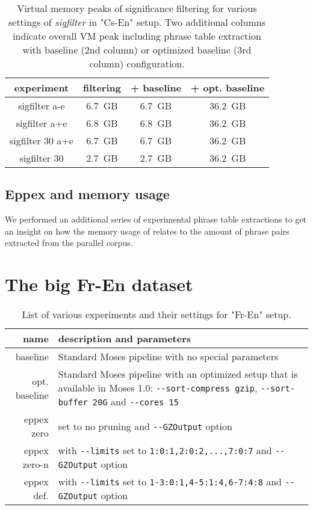 \begin{table}[ht]
\centering
\begin{tabular}{ | c | c | c | c | }
\hline
experiment & filtering & + baseline & + opt. baseline \\
\hline
\hline
sigfilter a-e     & 6.7~GB & 6.7~GB & 36.2~GB \\
sigfilter a+e     & 6.8~GB & 6.8~GB & 36.2~GB \\
sigfilter 30 a+e  & 6.7~GB & 6.7~GB & 36.2~GB \\
sigfilter 30      & 2.7~GB & 2.7~GB & 36.2~GB \\
\hline
\end{tabular}
\caption{\label{cs-en-wmt13-sigfilter-vm-peak-benchmarks}
Virtual memory peaks of significance filtering for various settings of \emph{sigfilter} in "Cs-En" setup.
Two additional columns indicate overall VM peak including phrase table extraction
with baseline (2nd column) or optimized baseline (3rd column) configuration.}
\end{table}

\subsection{Eppex and memory usage}


We performed an additional series of experimental phrase table extractions
to get an insight on how the memory usage of \eppex{} relates to the amount of
phrase pairs extracted from the parallel corpus.

\section{The big Fr-En dataset}

\begin{table}[ht]
\centering
\begin{tabular}{ r p{10cm} }
name & description and parameters \\
\hline
\hline
baseline      & Standard Moses pipeline with no special parameters \\
opt. baseline & Standard Moses pipeline with an optimized setup that is available in Moses 1.0:
\verb|--sort-compress gzip|, \verb|--sort-buffer 20G| and \verb|--cores 15| \\
eppex zero    & \eppex{} set to no pruning and \verb|--GZOutput| option \\
eppex zero-n  & \eppex{} with \verb|--limits| set to \verb|1:0:1,2:0:2,...,7:0:7| and \verb|--GZOutput| option \\
eppex def.    & \eppex{} with \verb|--limits| set to \verb|1-3:0:1,4-5:1:4,6-7:4:8| and \verb|--GZOutput| option \\
\hline
\hline
\end{tabular}
\caption{\label{fr-en-80-scenarios}List of various experiments and their
settings for "Fr-En" setup.}
\end{table}


